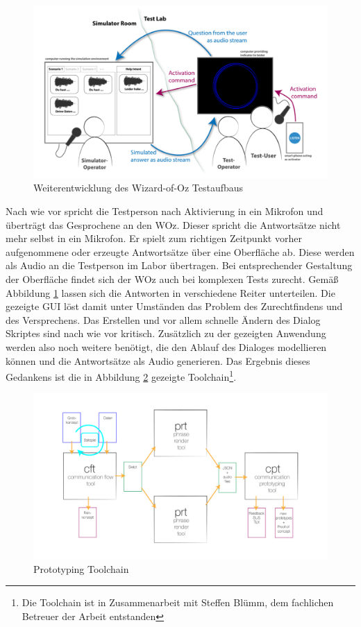 \begin{figure}[!htb]
    \centering
    \includegraphics[width=1.0\textwidth]{bilder/3_wozFinal.png}
    \caption{Weiterentwicklung des Wizard-of-Oz Testaufbaus}
    \label{fig:woz-weiterentwicklung}
\end{figure}

Nach wie vor spricht die Testperson nach Aktivierung in ein Mikrofon und überträgt das Gesprochene an den \ac{WOz}. Dieser spricht die Antwortsätze nicht mehr selbst in ein Mikrofon. Er spielt zum richtigen Zeitpunkt vorher aufgenommene oder erzeugte Antwortsätze über eine Oberfläche ab. Diese werden als Audio an die Testperson im Labor übertragen. Bei entsprechender Gestaltung der Oberfläche findet sich der \ac{WOz} auch bei komplexen Tests zurecht. Gemäß Abbildung \ref{fig:woz-weiterentwicklung} lassen sich die Antworten in verschiedene Reiter unterteilen. Die gezeigte \ac{GUI} löst damit unter Umständen das Problem des Zurechtfindens und des Versprechens. Das Erstellen und vor allem schnelle Ändern des Dialog Skriptes sind nach wie vor kritisch. Zusätzlich zu der gezeigten Anwendung werden also noch weitere benötigt, die den Ablauf des Dialoges modellieren können und die Antwortsätze als Audio generieren. Das Ergebnis dieses Gedankens ist die in Abbildung \ref{fig:prototyping-toolchain} gezeigte Toolchain\footnote{Die Toolchain ist in Zusammenarbeit mit Steffen Blümm, dem fachlichen Betreuer der Arbeit entstanden}.

\begin{figure}[!htb]
    \centering
    \includegraphics[width=1.0\textwidth]{bilder/3_toolchain-final.png}
    \caption{Prototyping Toolchain}
    \label{fig:prototyping-toolchain}
\end{figure}

